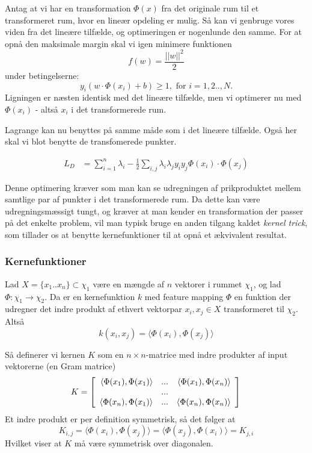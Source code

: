 \documentclass{article}
\begin{document}
Antag at vi har en transformation $\Phi(x)$ fra det originale rum til et transformeret rum, hvor en lineær opdeling er mulig. Så kan vi genbruge vores viden fra det lineære tilfælde, og optimeringen er nogenlunde den samme. For at opnå den maksimale margin skal vi igen minimere funktionen 
$$f(w)=\frac{||w||^2}{2}$$
under betingelserne:
$$y_i(w\cdot\Phi(x_i)+b)\geq 1,\text{ for }i=1,2..,N.$$
Ligningen er næsten identisk med det lineære tilfælde, men vi optimerer nu med $\Phi(x_i)$ - altså $x_i$ i det transformerede rum.

Lagrange kan nu benyttes på samme måde som i det lineære tilfælde. Også her skal vi blot benytte de transfomerede punkter.

\begin{align*}
L_D&=\sum_{i=1}^{n}\lambda_i-\frac{1}{2}\sum_{i,j}\lambda_i\lambda_j y_iy_j\Phi(x_i)\cdot\Phi(x_j)
\end{align*}

Denne optimering kræver som man kan se udregningen af prikproduktet mellem samtlige par af punkter i det transformerede rum. Da dette kan være udregningsmæssigt tungt, og kræver at man kender en transformation der passer på det enkelte problem, vil man typisk bruge en anden tilgang kaldet \textit{kernel trick}, som tillader os at benytte kernefunktioner til at opnå et ækvivalent resultat.


\subsubsection{Kernefunktioner}
Lad $X=\{x_1..x_n\}\subset \chi_1$ være en mængde af $n$ vektorer i rummet $\chi_1$, og lad $\Phi:\chi_1\rightarrow\chi_2$. Da er en kernefunktion $k$ med feature mapping $\Phi$ en funktion der udregner det indre produkt af ethvert vektorpar $x_i,x_j\in X$ transformeret til $\chi_2$. Altså
\begin{equation}
k(x_i,x_j)=\langle\Phi(x_i),\Phi(x_j)\rangle
\end{equation}

Så definerer vi kernen $K$ som en $n\times n$-matrice med indre produkter af input vektorerne (en Gram matrice)
\begin{equation}
K=\left[\begin{array}{r r r}
\langle\Phi(x_1),\Phi(x_1)\rangle & ... & \langle\Phi(x_1),\Phi(x_n)\rangle\\
 & ... & \\
\langle\Phi(x_n),\Phi(x_1)\rangle & ... & \langle\Phi(x_n),\Phi(x_n)\rangle\\
\end{array}\right]\\
\end{equation}
Et indre produkt er per definition symmetrisk, så det følger at
\begin{equation}
K_{i,j}=\langle\Phi(x_i),\Phi(x_j)\rangle=\langle\Phi(x_j),\Phi(x_i)\rangle=K_{j,i}
\end{equation}
Hvilket viser at $K$ må være symmetrisk over diagonalen. 
\end{document}
